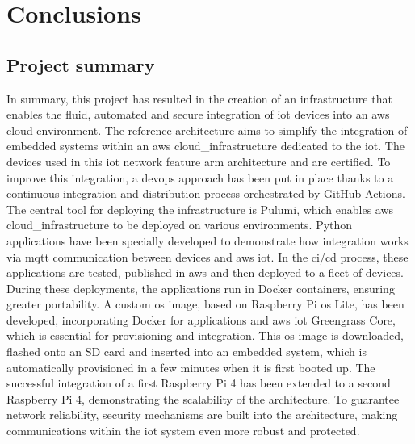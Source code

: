 %


\chapter{Conclusions}
\label{chap:conclusions}

\section{Project summary}

In summary, this project has resulted in the creation of an infrastructure that enables the fluid, automated and secure integration of \acrshort{iot} devices into an \gls{aws} \gls{cloud} environment. The reference architecture aims to simplify the integration of embedded systems within an \gls{aws} \gls{cloud_infrastructure} dedicated to the \acrshort{iot}. The devices used in this \acrshort{iot} network feature \gls{arm} architecture and are  certified. To improve this integration, a \acrshort{devops} approach has been put in place thanks to a continuous integration and distribution process orchestrated by GitHub Actions. The central tool for deploying the infrastructure is Pulumi, which enables \gls{aws} \gls{cloud_infrastructure} to be deployed on various environments. Python applications have been specially developed to demonstrate how integration works via \acrshort{mqtt} communication between devices and \gls{aws} \acrshort{iot}. In the \acrshort{ci}/\acrshort{cd} process, these applications are tested, published in \gls{aws} and then deployed to a fleet of devices. During these deployments, the applications run in Docker containers, ensuring greater portability. A custom \acrshort{os} image, based on Raspberry Pi \acrshort{os} Lite, has been developed, incorporating Docker for applications and \gls{aws} \acrshort{iot} Greengrass Core, which is essential for provisioning and integration.  This \acrshort{os} image is downloaded, flashed onto an SD card and inserted into an embedded system, which is automatically provisioned in a few minutes when it is first booted up. The successful integration of a first Raspberry Pi 4 has been extended to a second Raspberry Pi 4, demonstrating the scalability of the architecture. To guarantee network reliability, security mechanisms are built into the architecture, making communications within the \acrshort{iot} system even more robust and protected.

